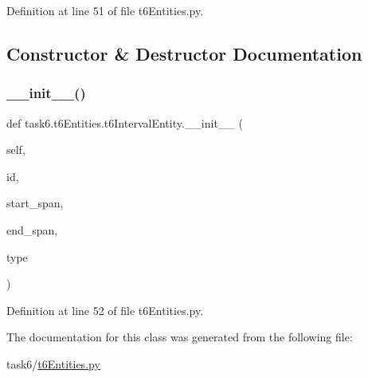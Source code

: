 Definition at line 51 of file t6\+Entities.\+py.



\subsection{Constructor \& Destructor Documentation}
\mbox{\label{classtask6_1_1t6Entities_1_1t6IntervalEntity_a6ddff3e7ac8e0049efcbd53db951445a}} 
\subsubsection{\texorpdfstring{\+\_\+\+\_\+init\+\_\+\+\_\+()}{\_\_init\_\_()}}
{\footnotesize\ttfamily def task6.\+t6\+Entities.\+t6\+Interval\+Entity.\+\_\+\+\_\+init\+\_\+\+\_\+ (\begin{DoxyParamCaption}\item[{}]{self,  }\item[{}]{id,  }\item[{}]{start\+\_\+span,  }\item[{}]{end\+\_\+span,  }\item[{}]{type }\end{DoxyParamCaption})}



Definition at line 52 of file t6\+Entities.\+py.



The documentation for this class was generated from the following file\+:\begin{DoxyCompactItemize}
\item 
task6/\hyperlink{t6Entities_8py}{t6\+Entities.\+py}\end{DoxyCompactItemize}
